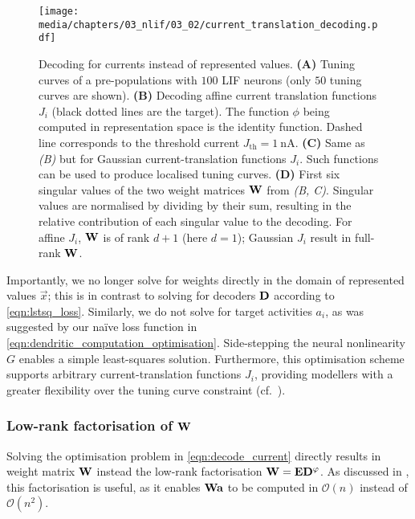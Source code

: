 \begin{figure}
	\texttt{[image: media/chapters/03\_nlif/03\_02/current\_translation\_decoding.pdf]}%
	{\label{fig:current_translation_decoding_a}}%
	{\label{fig:current_translation_decoding_b}}%
	{\label{fig:current_translation_decoding_c}}%
	{\label{fig:current_translation_decoding_d}}%
	\caption[Decoding for currents instead of represented values]{Decoding for currents instead of represented values. \textbf{(A)} Tuning curves of a pre-populations with $100$ LIF neurons (only $50$ tuning curves are shown). \textbf{(B)} Decoding affine current translation functions $J_i$ (black dotted lines are the target). The function $\phi$ being computed in re\-pre\-sen\-tat\-ion space is the identity function. Dashed line corresponds to the threshold current $J_\mathrm{th} = \SI{1}{\nano\ampere}$.
	\textbf{(C)} Same as \emph{(B)} but for Gaussian current-translation functions $J_i$. Such functions can be used to produce localised tuning curves.
	\textbf{(D)} First six singular values of the two weight matrices $\mathbf{W}$ from \emph{(B, C)}.
	Singular values are normalised by dividing by their sum, resulting in the relative contribution of each singular value to the decoding.
	For affine $J_i$, $\mathbf{W}$ is of rank $d + 1$ (here $d = 1$);
	Gaussian $J_i$ result in full-rank $\mathbf{W}$.
	}
\end{figure}

Importantly, we no longer solve for weights directly in the domain of represented values $\vec x$; this is in contrast to solving for decoders $\mathbf{D}$ according to \cref{eqn:lstsq_loss}.
Similarly, we do not solve for target activities $a_i$, as was suggested by our na\"ive loss function in \cref{eqn:dendritic_computation_optimisation}.
Side-stepping the neural nonlinearity $G$ enables a simple least-squares solution.
Furthermore, this optimisation scheme supports arbitrary current-translation functions $J_i$, providing modellers with a greater flexibility over the tuning curve constraint (cf.~).

\subsubsection{Low-rank factorisation of $\mathbf{W}$}
Solving the optimisation problem in \cref{eqn:decode_current} directly results in weight matrix $\mathbf{W}$ instead the low-rank factorisation $\mathbf{W} = \mathbf{E} \mathbf{D}^\varphi$.
As discussed in , this factorisation is useful, as it enables $\mathbf{W} \mathbf{a}$ to be computed in $\mathcal{O}(n)$ instead of $\mathcal{O}(n^2)$.

